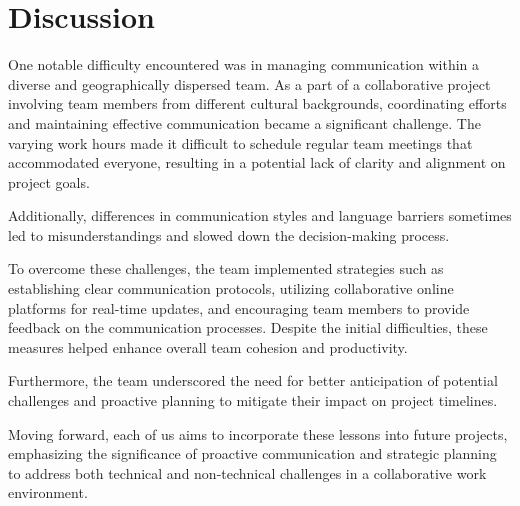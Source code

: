 \section{\textbf{Discussion}}

One notable difficulty encountered was in managing communication within a diverse and geographically dispersed team. As a part of a collaborative project involving team members from different cultural backgrounds, coordinating efforts and maintaining effective communication became a significant challenge. The varying work hours made it difficult to schedule regular team meetings that accommodated everyone, resulting in a potential lack of clarity and alignment on project goals.

Additionally, differences in communication styles and language barriers sometimes led to misunderstandings and slowed down the decision-making process.

To overcome these challenges, the team implemented strategies such as establishing clear communication protocols, utilizing collaborative online platforms for real-time updates, and encouraging team members to provide feedback on the communication processes. Despite the initial difficulties, these measures helped enhance overall team cohesion and productivity.

Furthermore, the team underscored the need for better anticipation of potential challenges and proactive planning to mitigate their impact on project timelines.

Moving forward, each of us aims to incorporate these lessons into future projects, emphasizing the significance of proactive communication and strategic planning to address both technical and non-technical challenges in a collaborative work environment.